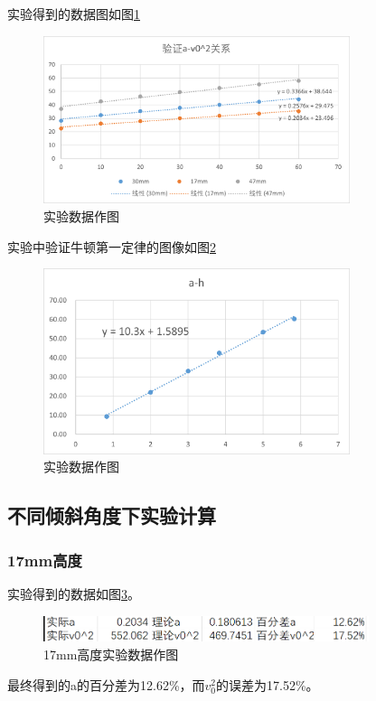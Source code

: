 \documentclass{ctexart}
\begin{document}
  实验得到的数据图如图\ref{zuotu}
  \begin{figure}[H]
    \centering
    \includegraphics[height=0.35\textheight,width=0.8\textwidth]{zuotu.png}
    \caption{实验数据作图}\label{zuotu}
  \end{figure}
  实验中验证牛顿第一定律的图像如图\ref{niuyi}
  \begin{figure}[H]
    \centering
    \includegraphics[height=0.35\textheight,width=0.8\textwidth]{yanzhenniuyi.png}
    \caption{实验数据作图}\label{niuyi}
  \end{figure}
  \newpage

  \subsection{不同倾斜角度下实验计算}
  \subsubsection{17mm高度}
  实验得到的数据如图\ref{17mm}。
  \begin{figure}[H]
    \centering
    \includegraphics[height=0.1\textheight,width=0.85\textwidth]{17mm.png}
    \caption{17mm高度实验数据作图}\label{17mm}
  \end{figure}
  最终得到的a的百分差为12.62\%，而$v_{0}^{2}$的误差为17.52\%。
\end{document}
